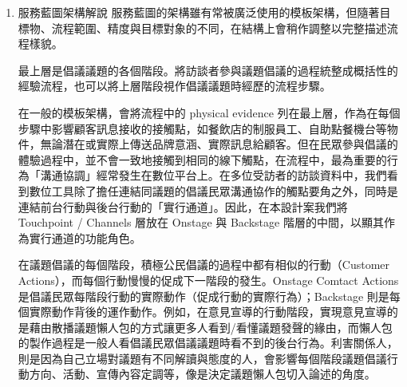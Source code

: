 \documentclass[12pt,a4paper]{article}
\begin{document}
\begin{enumerate}
\item 服務藍圖架構解說
\label{sec:org9adc4fa}
服務藍圖的架構雖有常被廣泛使用的模板架構，但隨著目標物、流程範圍、精度與目標對象的不同，在結構上會稍作調整以完整描述流程樣貌。

最上層是倡議議題的各個階段。將訪談者參與議題倡議的過程統整成概括性的經驗流程，也可以將上層階段視作倡議議題時經歷的流程步驟。

在一般的模板架構，會將流程中的 physical evidence 列在最上層，作為在每個步驟中影響顧客訊息接收的接觸點，如餐飲店的制服員工、自助點餐機台等物件，無論潛在或實際上傳送品牌意涵、實際訊息給顧客。但在民眾參與倡議的體驗過程中，並不會一致地接觸到相同的線下觸點，在流程中，最為重要的行為「溝通協調」經常發生在數位平台上。在多位受訪者的訪談資料中，我們看到數位工具除了擔任連結同議題的倡議民眾溝通協作的觸點要角之外，同時是連結前台行動與後台行動的「實行通道」。因此，在本設計案我們將 Touchpoint / Channels 層放在 Onstage 與 Backstage 階層的中間，以顯其作為實行通道的功能角色。

在議題倡議的每個階段，積極公民倡議的過程中都有相似的行動（Customer Actions），而每個行動慢慢的促成下一階段的發生。Onstage Comtact Actions 是倡議民眾每階段行動的實際動作（促成行動的實際行為）；Backstage 則是每個實際動作背後的運作動作。例如，在意見宣導的行動階段，實現意見宣導的是藉由散播議題懶人包的方式讓更多人看到/看懂議題發聲的緣由，而懶人包的製作過程是一般人看倡議民眾倡議議題時看不到的後台行為。利害關係人，則是因為自己立場對議題有不同解讀與態度的人，會影響每個階段議題倡議行動方向、活動、宣傳內容定調等，像是決定議題懶人包切入論述的角度。


\end{enumerate}
\end{document}
